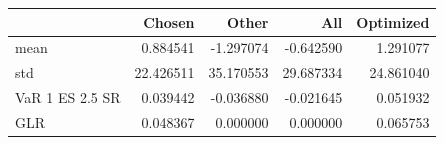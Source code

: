 \begin{tabular}{lrrrr}
\toprule
 & Chosen & Other & All & Optimized \\
\midrule
mean & 0.884541 & -1.297074 & -0.642590 & 1.291077 \\
std & 22.426511 & 35.170553 & 29.687334 & 24.861040 \\
VaR 1%
ES 2.5%
SR & 0.039442 & -0.036880 & -0.021645 & 0.051932 \\
GLR & 0.048367 & 0.000000 & 0.000000 & 0.065753 \\
\bottomrule
\end{tabular}
